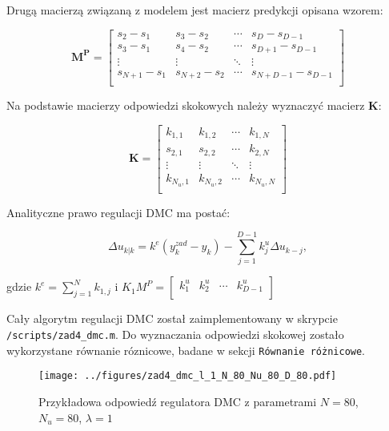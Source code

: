 \documentclass[a4paper,titlepage,11pt,floatssmall]{mwrep}
\begin{document}
Drugą macierzą związaną z modelem jest macierz predykcji opisana wzorem:

$$
\mathbf{M^{P}} =
\left[ \begin{array}{cccc}
s_2 - s_1 & s_3 - s_2 & \cdots & s_D - s_{D-1}  \\
s_3 - s_1 & s_4 - s_2 & \cdots & s_{D+1} - s_{D-1} \\
\vdots & \vdots & \ddots &  \vdots \\
s_{N+1} - s_1 & s_{N+2} - s_2 & \cdots & s_{N + D - 1} - s_{D-1}\\
\end{array} \right]
$$

Na podstawie macierzy odpowiedzi skokowych należy wyznaczyć macierz $\mathbf{K}$:

$$
\mathbf{K} =
\left[ \begin{array}{cccc}
k_{1,1} & k_{1,2} & \cdots & k_{1,N} \\
s_{2,1} & s_{2,2} & \cdots & k_{2,N} \\
\vdots & \vdots & \ddots & \vdots  \\
k_{N_u,1} & k_{N_u,2} & \cdots & k_{N_u,N}\\
\end{array} \right]
$$

Analityczne prawo regulacji DMC ma postać:

\begin{equation*}
\Delta u_{k|k} = k^{e}(y_k^{zad} - y_k) -\sum_{j=1}^{D-1} k_j^u \Delta u_{k-j},
\end{equation*}
\begin{center}
gdzie $k^{e} = \sum_{j=1}^{N} k_{1,j} $ i $
K_{1}M^{P} =
\left[ \begin{array}{cccc}
k_{1}^u & k_{2}^u & \cdots & k_{D-1}^u \\
\end{array} \right]
$
\end{center}

\bigskip
Cały algorytm regulacji DMC został zaimplementowany w skrypcie \texttt{/scripts/zad4\_{}dmc.m}. Do wyznaczania odpowiedzi skokowej zostało wykorzystane równanie róznicowe, badane w sekcji \texttt{Równanie różnicowe}.


\begin{figure}[H]
\centering
\texttt{[image: ../figures/zad4\_dmc\_l\_1\_N\_80\_Nu\_80\_D\_80.pdf]}
\caption{Przykładowa odpowiedź regulatora DMC z parametrami $N = 80$, $N_u = 80$, $\lambda = 1$}
\end{figure}
\end{document}
